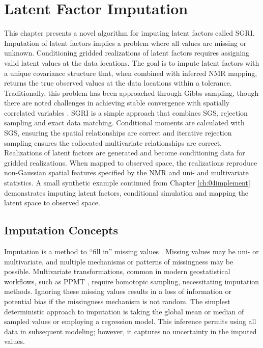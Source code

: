
\chapter{Latent Factor Imputation}
\label{ch:05impute}

This chapter presents a novel algorithm for imputing latent factors called \gls{SGRI}. Imputation of latent factors implies a problem where all values are missing or unknown. Conditioning gridded realizations of latent factors requires assigning valid latent values at the data locations. The goal is to impute latent factors with a unique covariance structure that, when combined with inferred \gls{NMR} mapping, returns the true observed values at the data locations within a tolerance. Traditionally, this problem has been approached through Gibbs sampling, though there are noted challenges in achieving stable convergence with spatially correlated variables \citep{silva2018enhanced}. \gls{SGRI} is a simple approach that combines \gls{SGS}, rejection sampling and exact data matching. Conditional moments are calculated with \gls{SGS}, ensuring the spatial relationships are correct and iterative rejection sampling ensures the collocated multivariate relationships are correct. Realizations of latent factors are generated and become conditioning data for gridded realizations. When mapped to observed space, the realizations reproduce non-Gaussian spatial features specified by the \gls{NMR} and uni- and multivariate statistics. A small synthetic example continued from Chapter \ref{ch:04implement} demonstrates imputing latent factors, conditional simulation and mapping the latent space to observed space.

\FloatBarrier
\section{Imputation Concepts}
\label{sec:impute}

Imputation is a method to ``fill in'' missing values \citep{little2019statistical}. Missing values may be uni- or multivariate, and multiple mechanisms or patterns of missingness may be possible. Multivariate transformations, common in modern geostatistical workflows, such as \gls{PPMT} \citep{barnett2014projection}, require homotopic sampling, necessitating imputation methods. Ignoring these missing values results in a loss of information or potential bias if the missingness mechanism is not random. The simplest deterministic approach to imputation is taking the global mean or median of sampled values or employing a regression model. This inference permits using all data in subsequent modeling; however, it captures no uncertainty in the imputed values.

